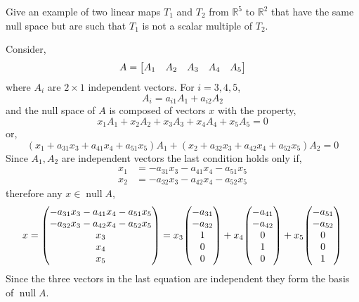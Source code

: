 \documentclass[11pt,a4paper]{scrartcl}
\DeclareMathOperator{\nspace}{null}
\newcounter{problem}
\begin{document}
\begin{problem}[3.B.31]
{
    Give an example of two linear maps $T_1$ and $T_2$ from
    $\mathbb{R}^5$ to $\mathbb{R}^2$ that have the same null space
    but are such that $T_1$ is not a scalar multiple of $T_2$.
}
{    
    Consider,
    \[
    A = \mqty[ A_1 & A_2 & A_3 & A_4 & A_5 ]
    \]
    where $A_i$ are $2 \times 1$ independent vectors. For $i=3,4,5$,
    \[
    A_i = a_{i1} A_1 + a_{i2} A_2 
    \]
    and the null space of $A$ is composed of vectors $x$ with the property,
    \[
    x_1A_1+x_2A_2+x_3A_3+x_4A_4+x_5A_5=0
    \]
    or,
    \[
    (x_1+a_{31}x_3+a_{41}x_4+a_{51}x_5)A_1
    +
    (x_2+a_{32}x_3+a_{42}x_4+a_{52}x_5)A_2
    =0
    \]
    Since $A_1,A_2$ are independent vectors the last condition holds 
    only if,
    \begin{align*}
    x_1 & = -a_{31}x_3-a_{41}x_4-a_{51}x_5 \\
    x_2 & = -a_{32}x_3-a_{42}x_4-a_{52}x_5    
    \end{align*}
    therefore any $x \in \nspace A$,
    \[
    x = \mqty(
    -a_{31}x_3-a_{41}x_4-a_{51}x_5 \\
    -a_{32}x_3-a_{42}x_4-a_{52}x_5  \\
    x_3 \\
    x_4 \\
    x_5
    )   
    = x_3 \mqty(
    -a_{31} \\
    -a_{32} \\
    1 \\
    0 \\
    0
    )
    +
    x_4 \mqty(
    -a_{41} \\
    -a_{42} \\
    0 \\
    1 \\
    0
    )
    +
    x_5 \mqty(
    -a_{51} \\
    -a_{52} \\
    0 \\
    0 \\
    1
    )
    \]
    Since the three vectors in the last equation are independent
    they form the basis of $\nspace A$.

}
\end{problem}
\end{document}
